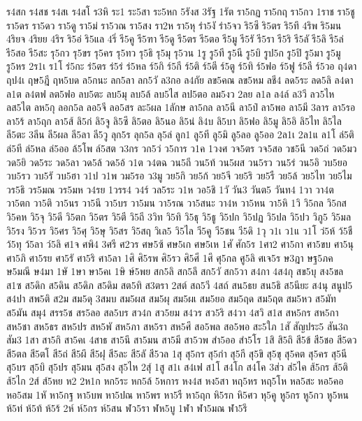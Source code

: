 {ร4สก
ร4สช
ร4สเ
ร4สโ
ร3หิ
ระ1
ระ5สา
ระ5หก
5รังส
3รัฐ
1รัต
รา5กฏ
รา5กฤ
รา5กว
1ราช
รา5ชู
รา5ดร
รา5ดว
รา5ดู
รา5ม่
รา5วณ
รา5สง
รา2ห
รา5หุ
รำ5งั
รำ5จว
ริ5ซึ
ริ5ตร
ริ5ทึ
4ริพ
ริ5มน
4ริยจ
4ริยย
4ริร
ริ5อ่
ริ5แล
4ริ่
รี5คู
รี5ฑา
รี5ดู
รี5ตร
รี5ตอ
รี5มู
รี5รั
รี5รา
รี5ริ
รี5ลั
รี5ลิ
รี5ล่
รี5สอ
รี5สะ
รุ5กว
รุ5ขร
รุ5คร
รุ5ทว
รุ5ธิ
รุ5มุ
รุ5วน
1รู
รู5ที
รู5นี
รู5บิ
รูป5ก
รู5ปิ
รู5มา
รู5มู
รู5หร
2ร1เ
ร1โ
ร่5กะ
ร่5ตร
ร่5ร่
ร่5หล
ร์5กิ
ร์5กี
ร์5ติ
ร์5ตี
ร์5ตู
ร์5ทิ
ร์5ฟอ
ร์5ฟู
ร์5ลี
ร์5วอ
ฤ4ดา
ฤป4เ
ฤษ5ฎี
ฤห5บด
ล5กนะ
ลก5ลา
ลก5วั
ล3กอ
ล4กัย
ลข5คณ
ลข5หม
ลชี4
ลด5ระ
ลด5ลิ
ล4ดา
ล1ต
ล4ตฟ
ลต5ฟอ
ลบ5ตะ
ลบ5มุ
ลบ5ล้
ลบ5ไส
ลป5ตอ
ลม5งว
2ลย
ล1ล
ล4ล์
ล3วี
ลว5ไห
ลส5ไต
ลห5กุ
ลอก5ล
ลอ5จี
ลอ5สร
ละ5ผล
1ลักษ
ลา5กล
ลา5นี
ลา5ป๋
ลา5พอ
ลา5มี
3ลาร
ลา5รอ
ลา5ร้
ลา5ฤก
ลา5ส้
ลิ5ก่
ลิ5จู
ลิ5ซึ
ลิ5ตอ
ลิ5นอ
ลิ5น่
ลิ4บ
ลิ5บา
ลิ5ฟอ
ลิ5มู
ลิ5อิ
ลิ5ไท
ลิ5ไล
ลี5ตะ
3ลีน
ลี5ผล
ลี5ลา
ลี5วู
ลุก5ร
ลุก5ล
ลุ5ล่
ลูก1
ลู5ที
ลู5มิ
ลู5ลอ
ลู5ออ
2ล1เ
2ล1แ
ล1โ
ล่5ติ
ล่5ที
ล่5หล
ล่5ออ
ล้5โพ
ล์5สต
ว3กร
วก5ว่
ว5การ
ว1ค
1วงศ
วจ5ตร
วจ5สอ
วช5นี
วด5ถ่
วด5มว
วด5ยิ
วด5ระ
วด5ลา
วด5ล้
วด5อ้
ว1ต
ว4ตฉ
วน5ถี
วน5ท้
วน5ผส
วน5รว
วน5ร่
วน5อิ
วบ5ยอ
วบ5รว
วบ5รั
วบ5ฮา
ว1ป
ว1พ
วม5รอ
ว3มู
วย5กิ
วย5ก้
วย5จี
วย5ริ
วย5รื
วย5ล้
วย5ไท
วย5ไม
วร5ธิ
วร5มณ
วร5มห
ว4รย
1วรร4
ว4ร์
วล5ระ
ว1ห
วอ5ชิ
1วั
วัน3
วันต5
วันท4
1วา
วา4ต
วา5ตก
วา5ติ
วา5นร
วา5นึ
วา5บร
วา5มน
วา5รณ
วา5สนะ
วา4ห
วา5หน
วา5หิ
1วิ
วิ5กล
วิ5กส
วิ5คห
วิ5จุ
วิ5ดี
วิ5ตก
วิ5ตร
วิ5ตี
วิ5ถี
3วิท
วิ5ทิ
วิ5ธุ
วิ5ธู
วิ5ปก
วิ5ปฏ
วิ5ปล
วิ5ปว
วิภู5
วิ5มล
วิ5รง
วิ5วร
วิ5ศร
วิ5ศุ
วิ5ษุ
วิ5สร
วิ5สฤ
วิเล5
วิ5ไล
วี5คู
วี5ชน
วี5ดิ
1วุ
ว1เ
ว1แ
ว1โ
ว่5ห้
ว้5ชื
ว้5ทุ
ว้5ลา
ว์5ลิ
ศ1จ
ศพิ4
3ศรี
ศ2วร
ศษ5ซ้
ศษ5เก
ศษ5เห
1ศั
ศัก5ร
1ศา2
ศา5กา
ศา5ขบ
ศา5นุ
ศา5ภิ
ศา5รย
ศา5รั
ศา5ริ
ศา5ลา
1ศิ
ศิ5รพ
ศิ5รว
ศิ5ศี
1ศึ
ศุ5กล
ศู5ลิ
ศเจ5ร
ษ3ฎา
ษฐ5ภค
ษ5มณี
ษ4มา
1ษั
1ษา
ษา5คเ
1ษิ
ษ์5พย
สก5ลิ
สก5ลึ
สก5วั
สก5วา
ส4กา
4ส4กุ
สข5บุ
สง5ขล
ส1ซ
ส5ดิก
ส5ดิน
ส5ดิภ
ส5ดิม
สต5ทิ
ส3ตรา
2สต์
สถ5วี
4สถ์
สน5ธย
สน5ธิ
ส5นียะ
ส4นุ
สนูป5
ส4ปา
สพ5ติ
ส2ม
สม5ดุ
3สมบ
สม5ผส
สม5ผุ
สม5ผเ
สม5ยอ
สม5ฤด
สม5ฤต
สม5หว
ส5มัท
ส5มัน
สมุ4
สรร5ช
สร5ลอ
สล5บร
สว4ก
สว5ยม
ส4วร
สว5ริ
ส4วา
4สวิ
ส1ส
สห5กร
สห5กา
สห5ชา
สห5ธร
สห5ปร
สห5พั
สห5ภา
สห5รา
สห5ศึ
สอ5พล
สอ5พอ
สะ5ใภ
1สั
สัญประ5
สัน3ถ
สัม3
1สา
สา5กิ
สา5คเ
4สาธ
สา5นึ
สา5มน
สา5มี
สา5วพ
สำ5ออ
สำ5โร
1สิ
สิ5ถิ
สี5ข้
สี5ชอ
สี5ดว
สี5ตล
สี5ตโ
สี5ถ่
สี5ผึ
สี5ฝุ
สี5ละ
สี5ลั
สี5วล
1สุ
สุ5กร
สุ5กำ
สุ5กี
สุ5ขิ
สุ5ขุ
สุ5คต
สุ5คร
สุ5นี
สุ5บร
สุ5บิ
สุ5ปร
สุ5มน
สุ5สง
สุ5ไห
2สุ์
1สู
ส1เ
ส4เฟ
ส1โ
ส4โก
ส4โค
3ส่ว
ส่5ไค
ส้5กร
ส้5ติ
ส้5ไก
2ส์
ส์5หย
ห2
2ห1ก
หก5ระ
หก5ล้
5หการ
หง4ส
หง5สา
หฤ5หร
หฤ5โห
หล5สะ
หอ5คอ
หอ5สม
1หั
หา5กฐ
หา5บพ
หา5ปณ
หา5พร
หา5รื
หา5ฤก
หิ5รก
หิ5ศว
หุ5คู
หู5กร
หู5กว
หู5หน
ห้5ท่
ห้5ท้
ห้5ร้
2ห์
ห์5กร
ห์5สน
ฬว5รา
ฬห5บู
1ฬา
ฬา5มณ
ฬา5รึ
}
